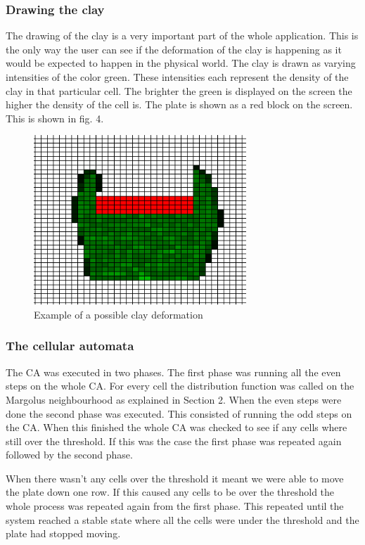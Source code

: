 \documentclass[a4paper,11pt,titlepage]{article}
\begin{document}
\subsubsection{Drawing the clay}
The drawing of the clay is a very important part of the whole application. This is the only way the user can see if the deformation of the clay is happening as it would be expected to happen in the physical world. The clay is drawn as varying intensities of the color green.
These intensities each represent the density of the clay in that particular cell. The brighter the green is displayed on the screen the higher the density of the cell is. 
The plate is shown as a red block on the screen.
This is shown in fig. 4.
\begin{figure}[htbp]
   \centering
   \includegraphics[width=8cm]{example1.png}
   \caption{Example of a possible clay deformation}
   \label{Figure:figex}
\end{figure}

\subsubsection{The cellular automata}
The CA was executed in two phases. The first phase was running all the even steps on the whole CA. For every cell the distribution function was called on the Margolus neighbourhood as explained in Section 2. When the even steps were done the second phase was executed. This consisted of running the odd steps on the CA.
When this finished the whole CA was checked to see if any cells where still over the threshold. If this was the case the first phase was repeated again followed by the second phase.

When there wasn't any cells over the threshold it meant we were able to move the plate down one row. If this caused any cells to be over the threshold the whole process was repeated again from the first phase. This repeated until the system reached a stable state where all the cells were under the threshold and the plate had stopped moving.
\end{document}
